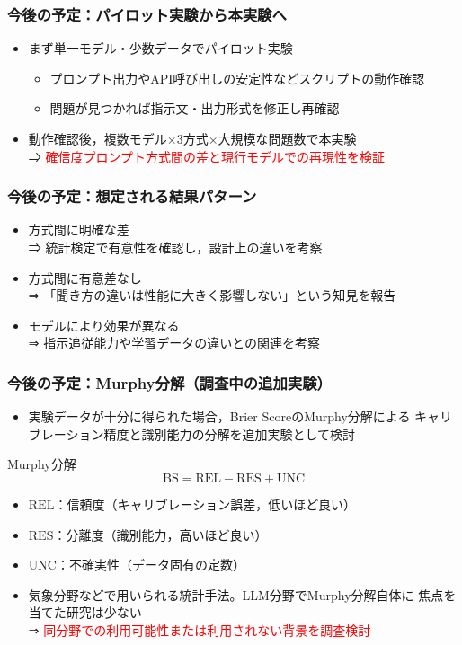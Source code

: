 \documentclass[dvipdfmx]{beamer}
\begin{document}
\begin{frame}
\frametitle{今後の予定：パイロット実験から本実験へ}
\begin{itemize}
	\item まず単一モデル・少数データでパイロット実験
	\begin{itemize}
		\item プロンプト出力やAPI呼び出しの安定性などスクリプトの動作確認
		\item 問題が見つかれば指示文・出力形式を修正し再確認
	\end{itemize}
	\vspace{10pt}
	\item 動作確認後，複数モデル×3方式×大規模な問題数で本実験
	\\⇒ \textcolor{red}{確信度プロンプト方式間の差と現行モデルでの再現性を検証}
\end{itemize}
\end{frame}

\begin{frame}
\frametitle{今後の予定：想定される結果パターン}
\begin{itemize}
	\item[(a)] 方式間に明確な差
	\\⇒ 統計検定で有意性を確認し，設計上の違いを考察
	\vspace{5pt}
	\item[(b)] 方式間に有意差なし
	\\⇒ 「聞き方の違いは性能に大きく影響しない」という知見を報告
	\vspace{5pt}
	\item[(c)] モデルにより効果が異なる
	\\⇒ 指示追従能力や学習データの違いとの関連を考察
\end{itemize}
\end{frame}

\begin{frame}
\frametitle{今後の予定：Murphy分解（調査中の追加実験）}
\begin{itemize}
	\item 実験データが十分に得られた場合，Brier ScoreのMurphy分解による
	      キャリブレーション精度と識別能力の分解を追加実験として検討
\end{itemize}
\begin{block}{Murphy分解}
\[
\mathrm{BS} = \mathrm{REL} - \mathrm{RES} + \mathrm{UNC}
\]
\end{block}
\begin{itemize}
	\item $\mathrm{REL}$：信頼度（キャリブレーション誤差，低いほど良い）
	\item $\mathrm{RES}$：分離度（識別能力，高いほど良い）
	\item $\mathrm{UNC}$：不確実性（データ固有の定数）
	\vspace{10pt}
	\item 気象分野などで用いられる統計手法。LLM分野でMurphy分解自体に
	      焦点を当てた研究は少ない
	\\⇒ \textcolor{red}{同分野での利用可能性または利用されない背景を調査検討}
\end{itemize}
\end{frame}
\end{document}
